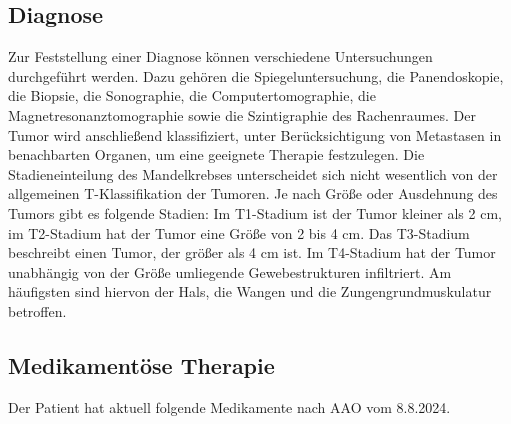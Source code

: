 \documentclass[a4paper,12pt]{article}
\begin{document}
\subsection{Diagnose}
Zur Feststellung einer Diagnose können verschiedene Untersuchungen durchgeführt
werden. Dazu gehören die Spiegeluntersuchung, die Panendoskopie, die Biopsie,
die Sonographie, die Computertomographie, die Magnetresonanztomographie sowie
die Szintigraphie des Rachenraumes. Der Tumor wird anschließend klassifiziert,
unter Berücksichtigung von Metastasen in benachbarten Organen, um eine geeignete
Therapie festzulegen. Die Stadieneinteilung des Mandelkrebses unterscheidet sich
nicht wesentlich von der allgemeinen T-Klassifikation der Tumoren. Je nach Größe
oder Ausdehnung des Tumors gibt es folgende Stadien: Im T1-Stadium ist der Tumor
kleiner als 2 cm, im T2-Stadium hat der Tumor eine Größe von 2 bis 4 cm. Das T3-Stadium
beschreibt einen Tumor, der größer als 4 cm ist. Im T4-Stadium hat der Tumor
unabhängig von der Größe umliegende Gewebestrukturen infiltriert. Am häufigsten
sind hiervon der Hals, die Wangen und die Zungengrundmuskulatur betroffen.

\subsection{Medikamentöse Therapie}

Der Patient hat aktuell folgende Medikamente nach AAO vom 8.8.2024.
\end{document}
